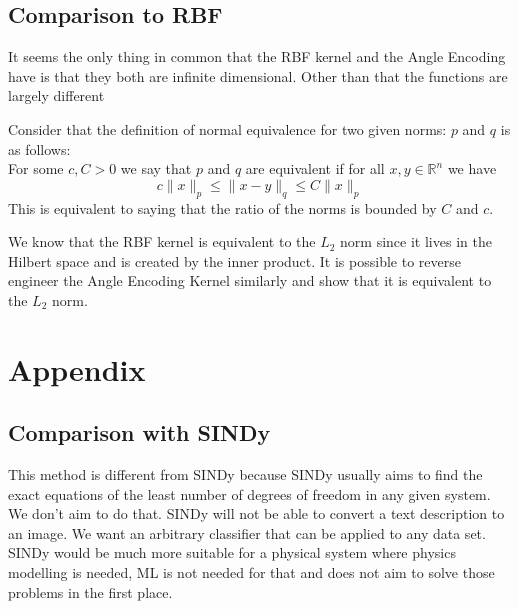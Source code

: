 \documentclass[hidelinks]{book}
\numberwithin{equation}{section}
\begin{document}
\subsection{Comparison to RBF}
It seems the only thing in common that the RBF kernel and the Angle Encoding have is that they both
are infinite dimensional. Other than that the functions are largely different

Consider that the definition of normal equivalence for two given norms: $p$ and $q$ is as follows:\\
For some $c,C > 0$ we say that $p$ and $q$ are equivalent if for all $x,y \in \mathbb{R}^n$ we have
$$c\|x\|_p \leq \|x-y\|_q \leq C\|x\|_p$$
This is equivalent to saying that the ratio of the norms is bounded by $C$ and $c$.

We know that the RBF kernel is equivalent to the $L_2$ norm since it lives in the Hilbert space and is
created by the inner product. It is possible to reverse engineer the Angle Encoding Kernel similarly
and show that it is equivalent to the $L_2$ norm.

\section{Appendix}
\subsection{Comparison with SINDy}
This method is different from SINDy because SINDy usually aims to find the exact equations of the least number of degrees of freedom in any given system. We don't aim to do that. SINDy will not be able to convert a text description to an image. We want an arbitrary classifier that can be applied to any data set. SINDy would be much more suitable for a physical system where physics modelling is needed, ML is not needed for that and does not aim to solve those problems in the first place.
\end{document}
